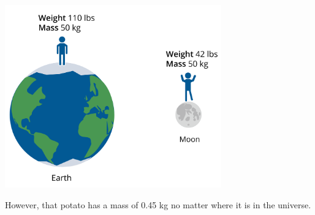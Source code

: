 \includegraphics[width=0.7\textwidth]{massvweight.png}

However, that potato has a mass of 0.45 kg no matter where it is in the universe.




